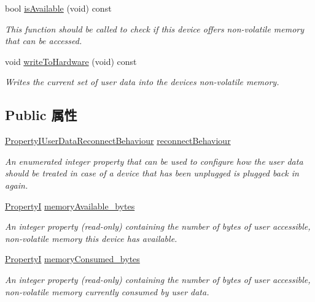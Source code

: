 \begin{DoxyCompactItemize}
bool \hyperlink{classmv_i_m_p_a_c_t_1_1acquire_1_1_user_data_a1b86acbf21478b9eb2ea528d67cbfe09}{is\+Available} (void) const 
\begin{DoxyCompactList}\small\item\em This function should be called to check if this device offers non-\/volatile memory that can be accessed. \end{DoxyCompactList}\item 
void \hyperlink{classmv_i_m_p_a_c_t_1_1acquire_1_1_user_data_ae6e2e87a923281c6a821b0f221b968b8}{write\+To\+Hardware} (void) const 
\begin{DoxyCompactList}\small\item\em Writes the current set of user data into the devices non-\/volatile memory. \end{DoxyCompactList}\end{DoxyCompactItemize}
\subsection*{Public 属性}
\begin{DoxyCompactItemize}
\item 
\hyperlink{group___common_interface_ga26a11fd50037db50142ec603904bcb8d}{Property\+I\+User\+Data\+Reconnect\+Behaviour} \hyperlink{classmv_i_m_p_a_c_t_1_1acquire_1_1_user_data_a14b5d5322cb10f3d6ce9b67e613a4cb4}{reconnect\+Behaviour}
\begin{DoxyCompactList}\small\item\em An enumerated integer property that can be used to configure how the user data should be treated in case of a device that has been unplugged is plugged back in again. \end{DoxyCompactList}\item 
\hypertarget{classmv_i_m_p_a_c_t_1_1acquire_1_1_user_data_a73d926fc65fbae2a8b78016744c20be8}{\hyperlink{group___common_interface_ga12d5e434238ca242a1ba4c6c3ea45780}{Property\+I} \hyperlink{classmv_i_m_p_a_c_t_1_1acquire_1_1_user_data_a73d926fc65fbae2a8b78016744c20be8}{memory\+Available\+\_\+bytes}}\label{classmv_i_m_p_a_c_t_1_1acquire_1_1_user_data_a73d926fc65fbae2a8b78016744c20be8}

\begin{DoxyCompactList}\small\item\em An integer property {\bfseries }(read-\/only) containing the number of bytes of user accessible, non-\/volatile memory this device has available. \end{DoxyCompactList}\item 
\hyperlink{group___common_interface_ga12d5e434238ca242a1ba4c6c3ea45780}{Property\+I} \hyperlink{classmv_i_m_p_a_c_t_1_1acquire_1_1_user_data_a4ea40b43d2ffba2efb6c14bdd6583b59}{memory\+Consumed\+\_\+bytes}
\begin{DoxyCompactList}\small\item\em An integer property {\bfseries }(read-\/only) containing the number of bytes of user accessible, non-\/volatile memory currently consumed by user data. \end{DoxyCompactList}\end{DoxyCompactItemize}
